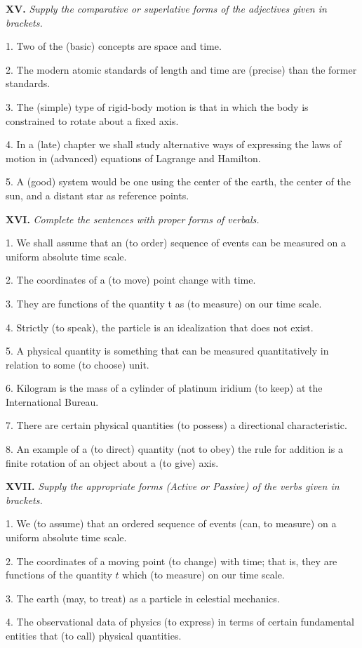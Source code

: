\documentclass[a4paper]{article}
\newcommand{\ETask}[2]{\medskip\par\textbf{#1.} \textit{#2}\par}
\begin{document}
\ETask{XV}{Supply the comparative or superlative forms of the adjectives given in brackets.}
1. Two of the (basic) concepts are space and time.

2. The modern atomic standards of length and time are (precise) than the former standards.

3. The (simple) type of rigid-body motion is that in which the body is constrained to rotate about a fixed axis.

4. In a (late) chapter we shall study alternative ways of expressing the laws of motion in (advanced) equations of
Lagrange and Hamilton.

5. A (good) system would be one using the center of the earth, the center of the sun, and a distant star as reference points.

\ETask{XVI}{Complete the sentences with proper forms of verbals.}

1. We shall assume that an (to order) sequence of events can be measured on a uniform absolute time scale.

2. The coordinates of a (to move) point change with time.

3. They are functions of the quantity t as (to measure) on our time scale.

4. Strictly (to speak), the particle is an idealization that does not exist.

5. A physical quantity is something that can be measured quantitatively in relation to some (to choose) unit.

6. Kilogram is the mass of a cylinder of platinum iridium (to keep) at the International Bureau.

7. There are certain physical quantities (to possess) a directional characteristic.

8. An example of a (to direct) quantity (not to obey) the rule for addition is a finite rotation of an object about a (to give) axis.

\ETask{XVII}{Supply the appropriate forms (Active or Passive) of the verbs given in brackets.}

1. We (to assume) that an ordered sequence of events (can, to measure) on a uniform absolute time scale.

2. The coordinates of a moving point (to change) with time; that is, they are functions of the quantity $t$ which (to measure)
on our time scale.

3. The earth (may, to treat) as a particle in celestial mechanics.

4. The observational data of physics (to express) in terms of certain fundamental entities that (to call) physical quantities.
\end{document}
